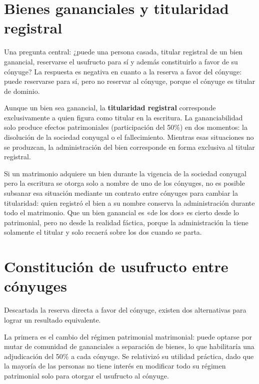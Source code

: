 \documentclass[12pt,oneside]{book}
\begin{document}
\section{Bienes gananciales y titularidad registral}

Una pregunta central: ¿puede una persona casada, titular registral de un bien ganancial, reservarse el usufructo para sí y además constituirlo a favor de su cónyuge? La respuesta es negativa en cuanto a la reserva a favor del cónyuge: puede reservarse para sí, pero no reservar al cónyuge, porque el cónyuge es titular de dominio.

\begin{important}
Aunque un bien sea ganancial, la \textbf{titularidad registral} corresponde exclusivamente a quien figura como titular en la escritura. La gananciabilidad solo produce efectos patrimoniales (participación del 50\%) en dos momentos: la disolución de la sociedad conyugal o el fallecimiento. Mientras esas situaciones no se produzcan, la administración del bien corresponde en forma exclusiva al titular registral.
\end{important}

Si un matrimonio adquiere un bien durante la vigencia de la sociedad conyugal pero la escritura se otorga solo a nombre de uno de los cónyuges, no es posible subsanar esa situación mediante un contrato entre cónyuges para cambiar la titularidad: quien registró el bien a su nombre conserva la administración durante todo el matrimonio. Que un bien ganancial es «de los dos» es cierto desde lo patrimonial, pero no desde la realidad fáctica, porque la administración la tiene solamente el titular y solo recaerá sobre los dos cuando se parta.

\section{Constitución de usufructo entre cónyuges}

Descartada la reserva directa a favor del cónyuge, existen dos alternativas para lograr un resultado equivalente.

La primera es el cambio del régimen patrimonial matrimonial: puede optarse por mutar de comunidad de gananciales a separación de bienes, lo que habilitaría una adjudicación del 50\% a cada cónyuge. Se relativizó su utilidad práctica, dado que la mayoría de las personas no tiene interés en modificar todo su régimen patrimonial solo para otorgar el usufructo al cónyuge.
\end{document}
